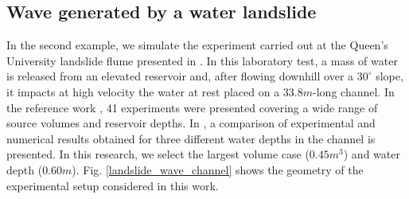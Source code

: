 




\subsection{Wave generated by a water landslide}
\label{Example2}

In the second example, we simulate the experiment carried out at the Queen's University landslide flume presented in \cite{bullard2019}. In this laboratory test, a mass of water is released from an elevated reservoir and, after flowing downhill over a $30^\circ$ slope, it impacts at high velocity the water at rest placed on a $33.8m$-long channel. 
In the reference work \cite{bullard2019}, 41 experiments were presented covering a wide range of source volumes and reservoir depths. In \cite{mulligan2020}, a comparison of experimental and numerical results obtained for three different water depths in the channel is presented. In this research, we select the largest volume case ($0.45m^3$) and water depth ($0.60m$). 
Fig. \ref{landslide_wave_channel} shows the geometry of the experimental setup considered in this work.



